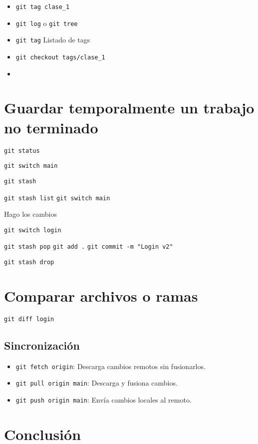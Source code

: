 \documentclass[
  doc,
  floatsintext,
  longtable,
  a4paper,
  nolmodern,
  notxfonts,
  notimes,
  colorlinks=true,linkcolor=blue,citecolor=blue,urlcolor=blue]{apa7}
\providecommand{\tightlist}{%
  \setlength{\itemsep}{0pt}\setlength{\parskip}{0pt}}
\begin{document}
\begin{itemize}
\tightlist
\item
  \texttt{git\ tag\ clase\_1}
\item
  \texttt{git\ log} o \texttt{git\ tree}
\item
  \texttt{git\ tag} Listado de tags
\item
  \texttt{git\ checkout\ tags/clase\_1}
\item
\end{itemize}

\section{Guardar temporalmente un trabajo no
terminado}\label{guardar-temporalmente-un-trabajo-no-terminado}

\texttt{git\ status}

\texttt{git\ switch\ main}

\texttt{git\ stash}

\texttt{git\ stash\ list} \texttt{git\ switch\ main}

Hago los cambios

\texttt{git\ switch\ login}

\texttt{git\ stash\ pop} \texttt{git\ add\ .}
\texttt{git\ commit\ -m\ "Login\ v2"}

\texttt{git\ stash\ drop}

\section{Comparar archivos o ramas}\label{comparar-archivos-o-ramas}

\texttt{git\ diff\ login}

\subsection{Sincronización}\label{sincronizaciuxf3n}

\begin{itemize}
\tightlist
\item
  \texttt{git\ fetch\ origin}: Descarga cambios remotos sin fusionarlos.
\item
  \texttt{git\ pull\ origin\ main}: Descarga y fusiona cambios.
\item
  \texttt{git\ push\ origin\ main}: Envía cambios locales al remoto.
\end{itemize}

\section{Conclusión}\label{conclusiuxf3n}
\end{document}

